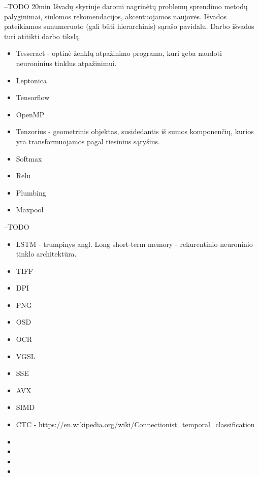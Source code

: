 \documentclass{VUMIFInfBakalaurinis}
\begin{document}
--TODO 20min
Išvadų skyriuje daromi nagrinėtų problemų sprendimo metodų palyginimai, siūlomos
rekomendacijos, akcentuojamos naujovės. Išvados pateikiamos sunumeruoto (gali būti
hierarchinis) sąrašo pavidalu. Darbo išvados turi atitikti darbo tikslą. 

\pagebreak
\printbibliography[heading=bibintoc]

\pagebreak
{}
\begin{itemize}
  \item Tesseract - optinė ženklų atpažinimo programa, kuri geba naudoti neuroninius tinklus atpažinimui.
  \item Leptonica
  \item Tensorflow
  \item OpenMP
  \item Tenzorius - geometrinis objektas, susidedantis iš sumos komponenčių, kurios yra transformuojamos pagal tiesinius sąryšius.
  \item Softmax
  \item Relu
  \item Plumbing
  \item Maxpool
\end{itemize}

--TODO
\begin{itemize}
  \item LSTM - trumpinys angl. Long short-term memory - rekurentinio neuroninio tinklo architektūra.
  \item TIFF
  \item DPI
  \item PNG
  \item OSD
  \item OCR
  \item VGSL
  \item SSE
  \item AVX
  \item SIMD
  \item CTC - https://en.wikipedia.org/wiki/Connectionist_temporal_classification
  \item 
  \item 
  \item 
  \item 
\end{itemize}

\appendix  %
\end{document}
